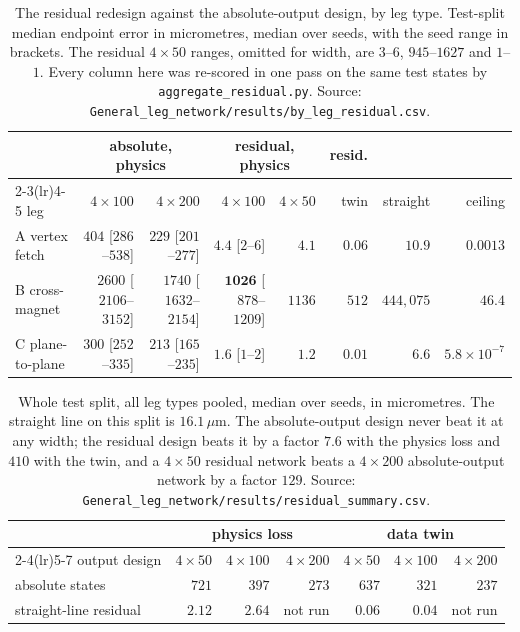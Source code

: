 \documentclass[11pt,a4paper]{article}
\newcommand{\um}{\ensuremath{\,\mu\mathrm{m}}}
\begin{document}
\begin{table}[tbp]
  \centering
  \caption{The residual redesign against the absolute-output design, by leg
  type. Test-split median endpoint error in micrometres, median over seeds, with
  the seed range in brackets. The residual $4\times50$ ranges, omitted for
  width, are $3$--$6$, $945$--$1627$ and $1$--$1$. Every column here was
  re-scored in one pass on the same test states by
  \texttt{aggregate\_residual.py}. Source:
  \texttt{General\_leg\_network/results/by\_leg\_residual.csv}.}
  \label{tab:residual}
  \footnotesize
  \setlength{\tabcolsep}{3pt}
  \begin{tabular}{lrrrrrrr}
    \toprule
    & \multicolumn{2}{c}{absolute, physics} & \multicolumn{2}{c}{residual, physics}
    & resid. & & \\
    \cmidrule(lr){2-3}\cmidrule(lr){4-5}
    leg & $4{\times}100$ & $4{\times}200$ & $4{\times}100$ & $4{\times}50$
        & twin & straight & ceiling \\
    \midrule
    A vertex fetch  & $404$ [$286$--$538$]   & $229$ [$201$--$277$]
                    & $\mathbf{4.4}$ [$2$--$6$] & $4.1$
                    & $0.06$ & $10.9$ & $0.0013$ \\
    B cross-magnet  & $2600$ [$2106$--$3152$] & $1740$ [$1632$--$2154$]
                    & $\mathbf{1026}$ [$878$--$1209$] & $1136$
                    & $512$ & $444{,}075$ & $46.4$ \\
    C plane-to-plane& $300$ [$252$--$335$]   & $213$ [$165$--$235$]
                    & $\mathbf{1.6}$ [$1$--$2$] & $1.2$
                    & $0.01$ & $6.6$ & $5.8\times10^{-7}$ \\
    \bottomrule
  \end{tabular}
\end{table}

\begin{table}[tbp]
  \centering
  \caption{Whole test split, all leg types pooled, median over seeds, in
  micrometres. The straight line on this split is $16.1\um$. The
  absolute-output design never beat it at any width; the residual design beats
  it by a factor $7.6$ with the physics loss and $410$ with the twin, and a
  $4 \times 50$ residual network beats a $4 \times 200$ absolute-output network
  by a factor $129$. Source:
  \texttt{General\_leg\_network/results/residual\_summary.csv}.}
  \label{tab:residual-split}
  \small
  \begin{tabular}{lrrrrrr}
    \toprule
    & \multicolumn{3}{c}{physics loss} & \multicolumn{3}{c}{data twin} \\
    \cmidrule(lr){2-4}\cmidrule(lr){5-7}
    output design & $4\times50$ & $4\times100$ & $4\times200$
                  & $4\times50$ & $4\times100$ & $4\times200$ \\
    \midrule
    absolute states & $721$ & $397$ & $273$ & $637$ & $321$ & $237$ \\
    straight-line residual & $\mathbf{2.12}$ & $\mathbf{2.64}$ & not run
                           & $\mathbf{0.06}$ & $\mathbf{0.04}$ & not run \\
    \bottomrule
  \end{tabular}
\end{table}
\end{document}
